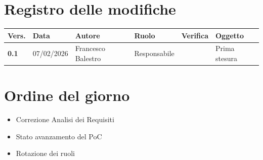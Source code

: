 \documentclass[a4paper,12pt]{article}
\begin{document}
    

    \newpage
    \section*{Registro delle modifiche}

    \begin{table}[h!]
        \begin{tabularx}{\textwidth}{|l|l|l|l|X|X|}
            \hline
            \textbf{Vers.} & \textbf{Data} & \textbf{Autore} & \textbf{Ruolo} & \textbf{Verifica} & \textbf{Oggetto} \\
            \hline
            \textbf{0.1} & 07/02/2026 & Francesco Balestro & Responsabile &  & Prima stesura \\
        \hline
        \end{tabularx}
    \end{table}

    \newpage
    \tableofcontents
    \newpage

    \section{Ordine del giorno} {
        \begin{itemize}
            \item Correzione Analisi dei Requisiti
            \item Stato avanzamento del PoC
            \item Rotazione dei ruoli
        \end{itemize}
    }
\end{document}

